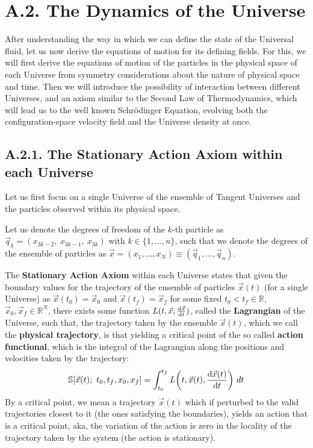 \documentclass[11pt, a4paper]{article} %
\newcommand{\R}{\mathbb{R}} %
\newcommand{\s}{\mathbb{S}}
\begin{document}
\newpage
{}
\section*{A.2. The Dynamics of the Universe}

After understanding the way in which we can define the state of the Universal fluid, let us now derive the equations of motion for its defining fields. For this, we will first derive the equations of motion of the particles in the physical space of each Universe from symmetry considerations about the nature of physical space and time. Then we will introduce the possibility of interaction between different Universes, and an axiom similar to the Second Law of Thermodynamics, which will lead us to the well known Schrödinger Equation, evolving both the configuration-space velocity field and the Universe density at once.

\subsection*{A.2.1. The Stationary Action Axiom within each Universe}


Let us first focus on a single Universe of the ensemble of Tangent Universes and the particles observed within its physical space.

Let us denote the degrees of freedom of the $k$-th particle as $\vec{q}_k=(x_{3k-2},\ x_{3k-1},\ x_{3k} )$ with $k\in\{1,...,n\}$, such that we denote the degrees of the ensemble of particles as $\vec{x}=(x_1,...,x_N)\equiv (\vec{q}_{1},...,\vec{q}_n)$.

The {\bf Stationary Action Axiom} within each Universe states that given the boundary values for the trajectory of the ensemble of particles $\vec{x}(t)$ (for a single Universe) as $\vec{x}(t_0)=\vec{x}_0$ and $\vec{x}(t_f)=\vec{x}_f$ for some fixed $t_0<t_f\in\R$, $\vec{x}_0, \vec{x}_f\in\R^N$, there exists some function $L(t, \vec{x}, \dv{\vec{x}}{t})$, called the {\bf Lagrangian} of the Universe, such that, the trajectory taken by the ensemble $\vec{x}(t)$, which we call the {\bf physical trajectory}, is that yielding a critical point of the so called {\bf action functional}, which is the integral of the Lagrangian along the positions and velocities taken by the trajectory:
\begin{equation}\label{action}
\s\qty[\vec{x}(t);\ t_0,t_f,x_0, x_f] = \int_{t_0}^{t_f} L\qty(t, \vec{x}(t),\dv{\vec{x}(t)}{t}(t))\ dt
\end{equation}
By a critical point, we mean a trajectory $\vec{x}(t)$ which if perturbed to the valid trajectories closest to it (the ones satisfying the boundaries), yields an action that is a critical point, aka, the variation of the action is zero in the locality of the trajectory taken by the system (the action is stationary).
\end{document}
